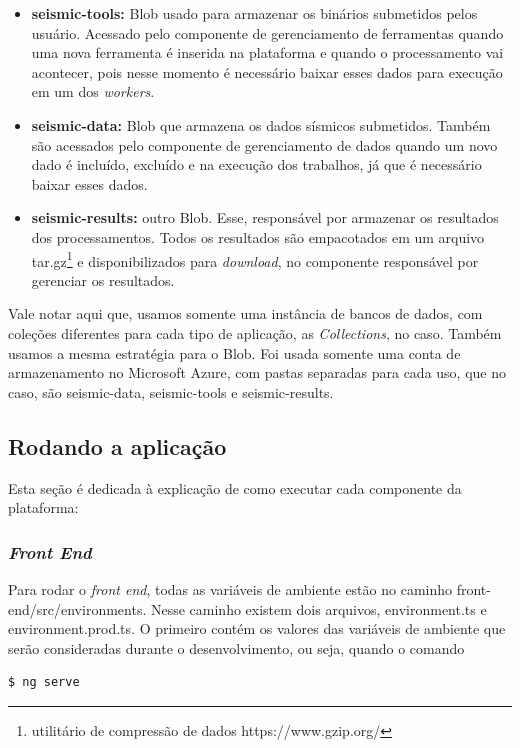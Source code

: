 \documentclass[11pt,twoside]{article}
\begin{document}
\begin{itemize}
  \item \textbf{seismic-tools:} Blob usado para armazenar os binários submetidos pelos usuário. Acessado pelo componente de gerenciamento de ferramentas quando uma nova ferramenta é inserida na plataforma 
  e quando o processamento vai acontecer, pois nesse momento é necessário baixar esses dados para execução em um dos \emph{workers}.
  \item \textbf{seismic-data:} Blob que armazena os dados sísmicos submetidos. Também são acessados pelo componente de gerenciamento de dados quando um novo dado é incluído, excluído e na execução dos 
  trabalhos, já que é necessário baixar esses dados.
  \item \textbf{seismic-results:} outro Blob. Esse, responsável por armazenar os resultados dos processamentos. Todos os resultados são empacotados em um arquivo tar.gz\footnote{ utilitário de compressão de dados https://www.gzip.org/} e disponibilizados para \emph{download}, 
  no componente responsável por gerenciar os resultados.
\end{itemize}

Vale notar aqui que, usamos somente uma instância de bancos de dados, com coleções diferentes para cada tipo de aplicação, as \emph{Collections}, no caso. Também usamos a mesma estratégia para o Blob. Foi usada somente 
uma conta de armazenamento no Microsoft Azure, com pastas separadas para cada uso, que no caso, são seismic-data, seismic-tools e seismic-results. 

\subsection{Rodando a aplicação}

Esta seção é dedicada à explicação de como executar cada componente da plataforma:

\subsubsection{\emph{Front End}}

Para rodar o \emph{front end}, todas as variáveis de ambiente estão no caminho front-end/src/environments. Nesse caminho existem dois arquivos, environment.ts e environment.prod.ts.
O primeiro contém os valores das variáveis de ambiente que serão consideradas durante o desenvolvimento, ou seja, quando o comando

\begin{lstlisting}[language=bash]
  $ ng serve 
\end{lstlisting}
\end{document}
